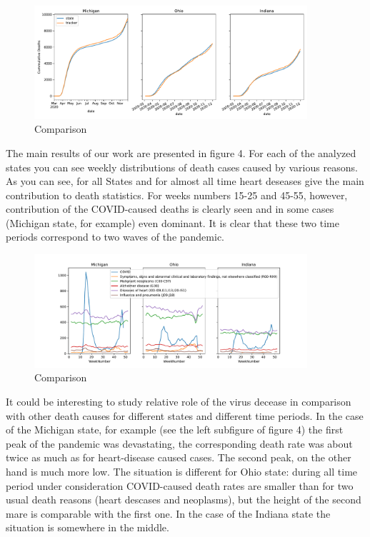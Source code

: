 \documentclass[conference]{IEEEtran}
\begin{document}
\begin{figure}
  \centering
  \includegraphics[width=0.9\textwidth]{figs/raw_tracker_comp_cum}
  \caption{Comparison}
  \label{fig:RT_comp_CUM}
\end{figure}

The main results of our work are presented in figure 4. For each of the analyzed states you can see weekly distributions of death cases caused by various reasons. As you can see, for all States and for almost all time heart deseases give the main contribution to death statistics. For weeks numbers 15-25 and 45-55, however, contribution of the COVID-caused deaths is clearly seen and in some cases (Michigan state, for example) even dominant. It is clear that these two time periods correspond to two waves of the pandemic.


\begin{figure}
  \centering
  \includegraphics[width=0.9\textwidth]{figs/weekly_deaths}
  \caption{Comparison}
  \label{fig:weekly_deaths}
\end{figure}

It could be interesting to study relative role of the virus decease in comparison with other death causes for different states and different time periods. In the case of the Michigan state, for example (see the left subfigure of figure 4) the first peak of the pandemic was devastating, the corresponding death rate was about twice as much as for heart-disease caused cases. The second peak, on the other hand is much more low. The situation is different for Ohio state: during all time period under consideration COVID-caused death rates are smaller than for two usual death reasons (heart descases and neoplasms), but the height of the second mare is comparable with the first one. In the case of the Indiana state the situation is somewhere in the middle.
\end{document}
